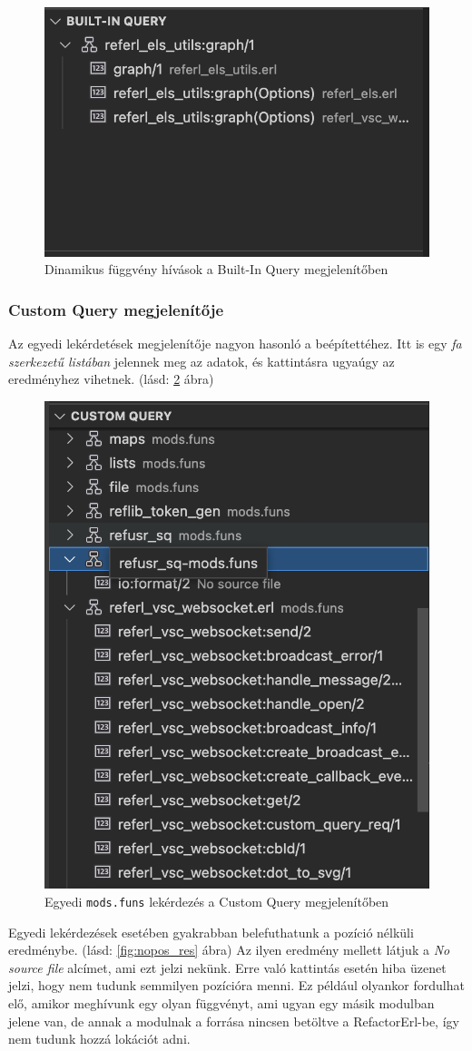\begin{figure}[H]
  \centering
  \includegraphics[width=0.5\linewidth]{images/builtin_query.png}
  \caption{Dinamikus függvény hívások a Built-In Query megjelenítőben}
  \label{fig:bultin_query_view}
\end{figure}

\subsubsection{Custom Query megjelenítője} \label{customQueryView}

Az egyedi lekérdetések megjelenítője nagyon hasonló a beépítettéhez. Itt is egy \textit{fa szerkezetű listában} jelennek meg az adatok, és kattintásra ugyaúgy az eredményhez vihetnek.
(lásd: \ref{fig:custom_query_view} ábra)

\begin{figure}[H]
  \centering
  \includegraphics[width=0.4\linewidth]{images/custom_query.png}
  \caption{Egyedi \lstinline{mods.funs} lekérdezés a Custom Query megjelenítőben}
  \label{fig:custom_query_view}
\end{figure}

Egyedi lekérdezések esetében gyakrabban belefuthatunk a pozíció nélküli eredménybe. (lásd: \ref{fig:nopos_res} ábra) Az ilyen eredmény mellett látjuk a \textit{No source file} alcímet, ami ezt jelzi nekünk. Erre való kattintás esetén hiba üzenet jelzi, hogy nem tudunk semmilyen pozícióra menni. Ez például olyankor fordulhat elő, amikor meghívunk egy olyan függvényt, ami ugyan egy másik modulban jelene van, de annak a modulnak a forrása nincsen betöltve a RefactorErl-be, így nem tudunk hozzá lokációt adni.

